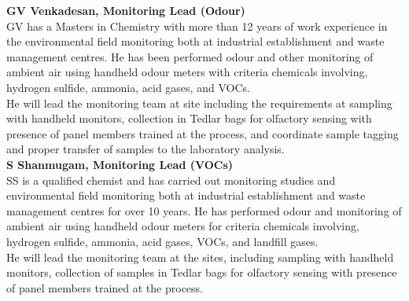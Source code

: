 \textbf{GV Venkadesan, Monitoring Lead (Odour)}\\
GV has a Masters in Chemistry with more than 12 years of work experience in the environmental field monitoring both at industrial establishment and waste management centres. He has been performed odour and other monitoring of ambient air using handheld odour meters with criteria chemicals involving, hydrogen sulfide, ammonia, acid gases, and VOCs.\\
He will lead the monitoring team at site including the requirements at sampling with handheld monitors, collection in Tedlar bags for olfactory sensing with presence of panel members trained at the process, and coordinate sample tagging and proper transfer of samples to the laboratory analysis. \\

\textbf{S Shanmugam, Monitoring Lead (VOCs)}\\
SS is a qualified chemist and has carried out monitoring studies and environmental field monitoring both at industrial establishment and waste management centres for over 10 years. He has performed odour and monitoring of ambient air using handheld odour meters for criteria chemicals involving,  hydrogen sulfide, ammonia, acid gases,  VOCs, and landfill gases.\\
He will lead the monitoring team at the sites,  including sampling with handheld monitors, collection of samples in Tedlar bags for olfactory sensing with presence of panel members trained at the process.\\




